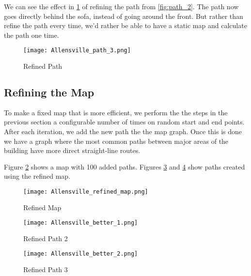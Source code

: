 \documentclass[10pt,twocolumn,letterpaper]{article}
\begin{document}
We can see the effect in \ref{fig:path_3} of refining the path from
\ref{fig:path_2}. The path now goes directly behind the sofa, instead
of going around the front. But rather than refine the path every time,
we'd rather be able to have a static map and calculate the path one time.

\begin{centering}
\begin{figure}[ht]
\caption{Refined Path} \centering
\texttt{[image: Allensville\_path\_3.png]}
\label{fig:path_3}
\end{figure}
\end{centering}

\subsection{Refining the Map}

To make a fixed map that is more efficient, we perform the the steps
in the previous section a configurable number of times on random start
and end points. After each iteration, we add the new path the the map
graph. Once this is done we have a graph where the most common paths
between major areas of the building have more direct straight-line
routes.

Figure \ref{fig:refined_map} shows a map with 100 added paths. Figures
\ref{fig:path_4} and \ref{fig:path_5} show paths created using the
refined map.

\begin{centering}
\begin{figure}[ht]
\caption{Refined Map} \centering
\texttt{[image: Allensville\_refined\_map.png]}
\label{fig:refined_map}
\end{figure}
\end{centering}

\begin{centering}
\begin{figure}[ht]
\caption{Refined Path 2} \centering
\texttt{[image: Allensville\_better\_1.png]}
\label{fig:path_4}
\end{figure}
\end{centering}

\begin{centering}
\begin{figure}[ht]
\caption{Refined Path 3} \centering
\texttt{[image: Allensville\_better\_2.png]}
\label{fig:path_5}
\end{figure}
\end{centering}
\end{document}
